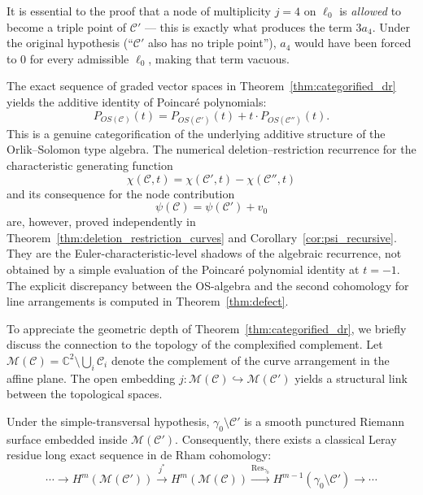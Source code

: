 \documentclass[article,11pt]{amsart} \numberwithin{equation}{section}
\numberwithin{equation}{section}
\begin{document}
{\begin{rk}
	It is essential to the proof that a node of multiplicity $j=4$ on $\ell_0$ is
	\emph{allowed} to become a triple point of $\mathcal C'$ --- this is exactly
	what produces the term $3a_4$. Under the original hypothesis (``$\mathcal C'$
	also has no triple point''), $a_4$ would have been forced to $0$ for every
	admissible $\ell_0$, making that term vacuous.
\end{rk}

\begin{rk}
	\label{rmk:numerical_shadow}
	The exact sequence of graded vector spaces in Theorem~\ref{thm:categorified_dr} yields the additive identity of Poincar\'e polynomials:
	\[
	P_{OS(\mathcal C)}(t)=P_{OS(\mathcal C')}(t)+t\cdot P_{OS(\mathcal C'')}(t).
	\]
	This is a genuine categorification of the underlying additive structure of the Orlik--Solomon type algebra. The numerical deletion--restriction recurrence for the characteristic generating function
	\[
	\chi(\mathcal C,t)=\chi(\mathcal C',t)-\chi(\mathcal C'',t)
	\]
	and its consequence for the node contribution
	\[
	\psi(\mathcal C)=\psi(\mathcal C')+v_0
	\]
	are, however, proved independently in Theorem~\ref{thm:deletion_restriction_curves} and Corollary~\ref{cor:psi_recursive}. They are the Euler-characteristic-level shadows of the algebraic recurrence, not obtained by a simple evaluation of the Poincar\'e polynomial identity at $t=-1$. The explicit discrepancy between the OS-algebra and the second cohomology for line arrangements is computed in Theorem~\ref{thm:defect}.
\end{rk}

To appreciate the geometric depth of Theorem~\ref{thm:categorified_dr}, 
we briefly discuss the connection to the topology of the complexified 
complement. Let $\mathcal M(\mathcal C) = \mathbb C^2 \setminus \bigcup_i \mathscr{C}_i$ 
denote the complement of the curve arrangement in the affine plane. 
The open embedding $j: \mathcal M(\mathcal C) \hookrightarrow \mathcal M(\mathcal C')$ 
yields a structural link between the topological spaces.

Under the simple-transversal hypothesis, $\gamma_0 \setminus \mathcal C'$ 
is a smooth punctured Riemann surface embedded inside $\mathcal M(\mathcal C')$. 
Consequently, there exists a classical Leray residue long exact sequence 
in de Rham cohomology:
\[
\cdots \longrightarrow H^m(\mathcal M(\mathcal C')) 
\xrightarrow{j^*} H^m(\mathcal M(\mathcal C)) 
\xrightarrow{\operatorname{Res}_{\gamma_0}} 
H^{m-1}(\gamma_0 \setminus \mathcal C') 
\longrightarrow \cdots
\]

}
\end{document}
